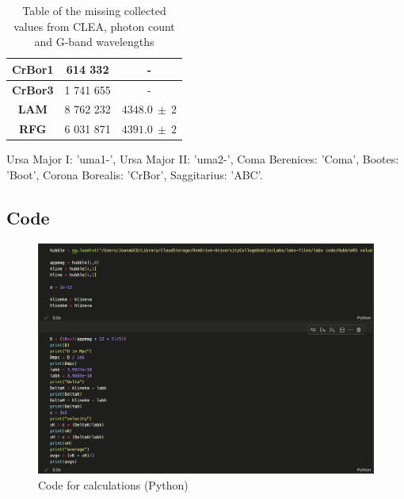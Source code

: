 \documentclass[12pt]{article}
\begin{document}
\begin{table}[H]
\begin{tabular}{|c|c|c|}
        \textbf{CrBor1}                                       & 614 332                                                & -                                                    \\ \hline
        \textbf{CrBor3}                                       & 1 741 655                                              & -                                                    \\ \hline
        \textbf{LAM}                                          & 8 762 232                                              & $4348.0 \: \pm \: 2$                                 \\ \hline
        \textbf{RFG}                                          & 6 031 871                                              & $4391.0 \: \pm \: 2$                                 \\ \hline
        \end{tabular}

    \caption{\centering \footnotesize{Table of the missing collected values from CLEA, photon count and G-band wavelengths}}
    \footnotesize{Ursa Major I: 'uma1-', Ursa Major II: 'uma2-', Coma Berenices: 'Coma', Bootes: 'Boot', Corona Borealis: 'CrBor', Saggitarius: 'ABC'.}
    \label{tab:A1}
    
\end{table}

\subsection*{Code}

\begin{figure}[H]
    \centering
    \includegraphics[width=14cm]{codeHUBBLE1.png}
    \caption{\centering Code for calculations (Python)}
    \label{fig:code1}  
\end{figure}
\end{document}
